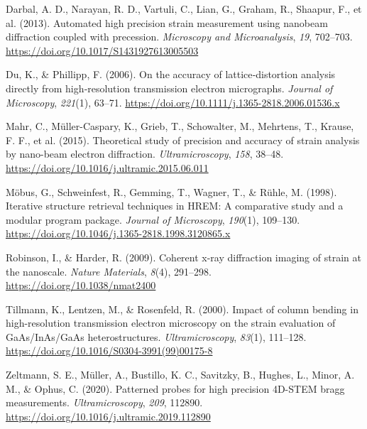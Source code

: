 \documentclass[
]{agujournal2019}
\newlength{\cslhangindent}
\newenvironment{CSLReferences}[2] %
 {\begin{list}{}{%
  \setlength{\itemindent}{0pt}
  \setlength{\leftmargin}{0pt}
  \setlength{\parsep}{0pt}
  \ifodd #1
   \setlength{\leftmargin}{\cslhangindent}
   \setlength{\itemindent}{-1\cslhangindent}
  \fi
  \setlength{\itemsep}{#2\baselineskip}}}
 {\end{list}}
\begin{document}
\label{refs}
\begin{CSLReferences}{1}{0}
Darbal, A. D., Narayan, R. D., Vartuli, C., Lian, G., Graham, R.,
Shaapur, F., et al. (2013). Automated high precision strain measurement
using nanobeam diffraction coupled with precession. \emph{Microscopy and
Microanalysis}, \emph{19}, 702--703.
\url{https://doi.org/10.1017/S1431927613005503}

Du, K., \& Phillipp, F. (2006). On the accuracy of lattice‐distortion
analysis directly from high‐resolution transmission electron
micrographs. \emph{Journal of Microscopy}, \emph{221}(1), 63--71.
\url{https://doi.org/10.1111/j.1365-2818.2006.01536.x}

Mahr, C., Müller-Caspary, K., Grieb, T., Schowalter, M., Mehrtens, T.,
Krause, F. F., et al. (2015). Theoretical study of precision and
accuracy of strain analysis by nano-beam electron diffraction.
\emph{Ultramicroscopy}, \emph{158}, 38--48.
\url{https://doi.org/10.1016/j.ultramic.2015.06.011}

Möbus, G., Schweinfest, R., Gemming, T., Wagner, T., \& Rühle, M.
(1998). Iterative structure retrieval techniques in {HREM}: A
comparative study and a modular program package. \emph{Journal of
Microscopy}, \emph{190}(1), 109--130.
\url{https://doi.org/10.1046/j.1365-2818.1998.3120865.x}

Robinson, I., \& Harder, R. (2009). Coherent x-ray diffraction imaging
of strain at the nanoscale. \emph{Nature Materials}, \emph{8}(4),
291--298. \url{https://doi.org/10.1038/nmat2400}

Tillmann, K., Lentzen, M., \& Rosenfeld, R. (2000). Impact of column
bending in high-resolution transmission electron microscopy on the
strain evaluation of {GaAs}/{InAs}/{GaAs} heterostructures.
\emph{Ultramicroscopy}, \emph{83}(1), 111--128.
\url{https://doi.org/10.1016/S0304-3991(99)00175-8}

Zeltmann, S. E., Müller, A., Bustillo, K. C., Savitzky, B., Hughes, L.,
Minor, A. M., \& Ophus, C. (2020). Patterned probes for high precision
4D-{STEM} bragg measurements. \emph{Ultramicroscopy}, \emph{209},
112890. \url{https://doi.org/10.1016/j.ultramic.2019.112890}

\end{CSLReferences}
\end{document}
